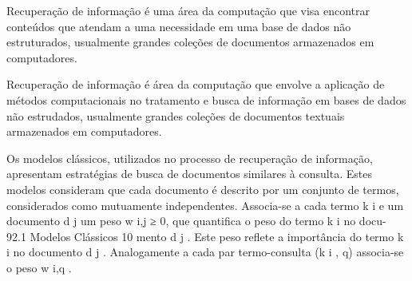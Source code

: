 Recuperação de informação é uma área da computação que visa encontrar conteúdos que atendam a uma necessidade em uma base de dados não estruturados, usualmente grandes coleções de documentos armazenados em computadores.


Recuperação de informação é área da computação que envolve a aplicação de métodos computacionais no tratamento e busca de informação em bases de dados não estrudados, usualmente grandes coleções de documentos textuais armazenados em computadores.







Os modelos clássicos, utilizados no processo de recuperação de informação, apresentam estratégias de busca de documentos similares à consulta. Estes modelos consideram que cada documento é descrito por um conjunto de termos, considerados como mutuamente independentes. Associa-se a cada termo k i e um documento d j um peso w i,j ≥ 0, que quantifica o peso do termo k i no docu- 92.1 Modelos Clássicos 10 mento d j . Este peso reflete a importância do termo k i no documento d j . Analogamente a cada par termo-consulta (k i , q) associa-se o peso w i,q .
